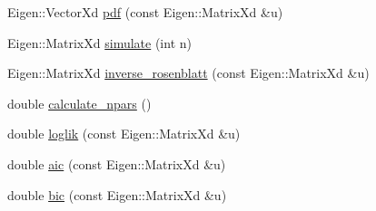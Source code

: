 \begin{DoxyCompactItemize}
$$\item 
Eigen\+::\+Vector\+Xd \hyperlink{classvinecopulib_1_1_vinecop_adf3760b8dd2b6d3a9cae5426188d4489}{pdf} (const Eigen\+::\+Matrix\+Xd \&u)
\item 
Eigen\+::\+Matrix\+Xd \hyperlink{classvinecopulib_1_1_vinecop_aa675aac119538648d60368a3572d1b5c}{simulate} (int n)
\item 
Eigen\+::\+Matrix\+Xd \hyperlink{classvinecopulib_1_1_vinecop_ac64ae8072851ea1cd4ed7143cac92933}{inverse\+\_\+rosenblatt} (const Eigen\+::\+Matrix\+Xd \&u)
\item 
double \hyperlink{classvinecopulib_1_1_vinecop_a507ad836872f9f702eed22ba25212515}{calculate\+\_\+npars} ()
\item 
double \hyperlink{classvinecopulib_1_1_vinecop_a53105af3a02ad07af454333733c21495}{loglik} (const Eigen\+::\+Matrix\+Xd \&u)
\item 
double \hyperlink{classvinecopulib_1_1_vinecop_afab8444e538c976fa601ab946dd76252}{aic} (const Eigen\+::\+Matrix\+Xd \&u)
\item 
double \hyperlink{classvinecopulib_1_1_vinecop_a3bee8adb75dee19687309a40bbd72000}{bic} (const Eigen\+::\+Matrix\+Xd \&u)
\end{DoxyCompactItemize}
